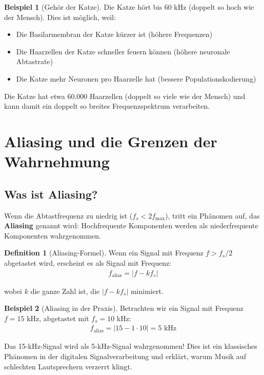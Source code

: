 ﻿\documentclass[a4paper,12pt]{report}
\theoremstyle{definition}
\newtheorem{definition}{Definition}
\newtheorem{beispiel}{Beispiel}
\begin{document}
	\begin{beispiel}[Gehör der Katze]
		Die Katze hört bis 60 kHz (doppelt so hoch wie der Mensch). Dies ist möglich, weil:
		\begin{itemize}
			\item[-] Die Basilarmembran der Katze kürzer ist (höhere Frequenzen)
			\item[-] Die Haarzellen der Katze schneller feuern können (höhere neuronale Abtastrate)
			\item[-] Die Katze mehr Neuronen pro Haarzelle hat (bessere Populationskodierung)
		\end{itemize}
		
		Die Katze hat etwa 60.000 Haarzellen (doppelt so viele wie der Mensch) und kann damit ein doppelt so breites Frequenzspektrum verarbeiten.
	\end{beispiel}
	
	\section{Aliasing und die Grenzen der Wahrnehmung}
	
	\subsection{Was ist Aliasing?}
	
	Wenn die Abtastfrequenz zu niedrig ist ($f_s < 2f_{\max}$), tritt ein Phänomen auf, das \textbf{Aliasing} genannt wird: Hochfrequente Komponenten werden als niederfrequente Komponenten wahrgenommen.
	
	\begin{definition}[Aliasing-Formel]
		Wenn ein Signal mit Frequenz $f > f_s/2$ abgetastet wird, erscheint es als Signal mit Frequenz:
		\begin{align}
			f_{\text{alias}} = |f - k f_s|
		\end{align}
		
		wobei $k$ die ganze Zahl ist, die $|f - k f_s|$ minimiert.
	\end{definition}
	
	\begin{beispiel}[Aliasing in der Praxis]
		Betrachten wir ein Signal mit Frequenz $f = 15$ kHz, abgetastet mit $f_s = 10$ kHz:
		\begin{align}
			f_{\text{alias}} = |15 - 1 \cdot 10| = 5 \text{ kHz}
		\end{align}
		
		Das 15-kHz-Signal wird als 5-kHz-Signal wahrgenommen! Dies ist ein klassisches Phäno\-men in der digitalen Signalverarbeitung und erklärt, warum Musik auf schlechten Lautsprechern verzerrt klingt.
	\end{beispiel}
	
\end{document}
